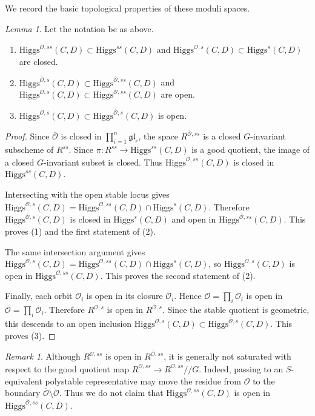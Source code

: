 \documentclass[11pt]{amsart}
\theoremstyle{plain}
\theoremstyle{definition}
\theoremstyle{remark}
\newtheorem{lemma}[theorem]{Lemma}
\newtheorem{remark}[theorem]{Remark}
\newcommand{\ov}[1]{\overline{#1}}
\newcommand{\cO}{\mathcal O}
\newcommand{\Higgs}{\mathrm{Higgs}}
\begin{document}
We record the basic topological properties of these moduli spaces.

\begin{lemma}\label{lem:residue-loci-closed-locally-closed}
Let the notation be as above. 
\begin{enumerate}
    \item $\Higgs^{\ov\cO,ss}(C,D)\subset\Higgs^{ss}(C,D)$ and $\Higgs^{\ov\cO,s}(C,D)\subset\Higgs^s(C,D)$ are closed.
    \item $\Higgs^{\ov\cO,s}(C,D)\subset\Higgs^{\ov\cO,ss}(C,D)$ and $\Higgs^{\cO,s}(C,D)\subset\Higgs^{\cO,ss}(C,D)$ are open.
    \item $\Higgs^{\cO,s}(C,D)\subset\Higgs^{\ov\cO,s}(C,D)$ is open.
\end{enumerate}
\end{lemma}
\begin{proof}
	Since $\ov\cO$ is closed in $\prod_{i=1}^n \mathfrak{gl}_r$, the space  $R^{\ov\cO,ss}$ is a closed $G$-invariant subscheme of
	$R^{ss}$. Since $\pi:R^{ss}\to \Higgs^{ss}(C,D)$ is a good quotient, the image
	of a closed $G$-invariant subset is closed. Thus
	$\Higgs^{\ov\cO,ss}(C,D)$ is closed in $\Higgs^{ss}(C,D)$.

	Intersecting with the open stable locus gives
	$\Higgs^{\ov\cO,s}(C,D)
	=\Higgs^{\ov\cO,ss}(C,D)\cap \Higgs^s(C,D)$.
	Therefore $\Higgs^{\ov\cO,s}(C,D)$ is closed in $\Higgs^s(C,D)$ and open in
	$\Higgs^{\ov\cO,ss}(C,D)$. This proves (1) and the first statement of (2).

	The same intersection argument gives
	$\Higgs^{\cO,s}(C,D)
	=\Higgs^{\cO,ss}(C,D)\cap \Higgs^s(C,D)$,
	so $\Higgs^{\cO,s}(C,D)$ is open in $\Higgs^{\cO,ss}(C,D)$. This proves the
	second statement of (2).

	Finally, each orbit $\cO_i$ is open in its closure $\ov\cO_i$. Hence
	$\cO=\prod_i\cO_i$ is open in $\ov\cO=\prod_i\ov\cO_i$. Therefore
	$R^{\cO,s}$ is open in $R^{\ov\cO,s}$. Since the stable quotient is geometric,
	this descends to an open inclusion
	$\Higgs^{\cO,s}(C,D)\subset \Higgs^{\ov\cO,s}(C,D)$.
	This proves (3).
\end{proof}


\begin{remark}\label{rem:semistable-residue-condition}
	Although $R^{\cO,ss}$ is open in $R^{\ov\cO,ss}$, it is generally not saturated
	with respect to the good quotient map
	$R^{\ov\cO,ss}\to R^{\ov\cO,ss}//G$. Indeed, passing to an $S$-equivalent
	polystable representative may move the residue from $\cO$ to the boundary
	$\ov\cO\setminus\cO$. Thus we do not claim that $\Higgs^{\cO,ss}(C,D)$ is
	open in $\Higgs^{\ov\cO,ss}(C,D)$.
\end{remark}
\end{document}
